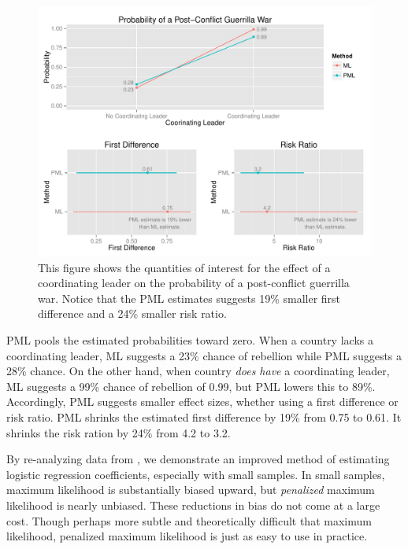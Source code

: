 \documentclass[12pt]{article}
\begin{document}
\begin{figure}[H]
\begin{center}
\includegraphics[width = \textwidth]{figs/weisiger-qis.pdf}
\caption{This figure shows the quantities of interest for the effect of a coordinating leader on the probability of a post-conflict guerrilla war. Notice that the PML estimates suggests 19\% smaller first difference and a 24\% smaller risk ratio.}\label{fig:weisiger-qis}
\end{center}
\end{figure}

PML pools the estimated probabilities toward zero. 
When a country lacks a coordinating leader, ML suggests a 23\% chance of rebellion while PML suggests a 28\% chance. 
On the other hand, when country \textit{does have} a coordinating leader, ML suggests a 99\% chance of rebellion of 0.99, but PML lowers this to 89\%. 
Accordingly, PML suggests smaller effect sizes, whether using a first difference or risk ratio. 
PML shrinks the estimated first difference by 19\% from 0.75 to 0.61. 
It shrinks the risk ration by 24\% from 4.2 to 3.2.  

By re-analyzing data from \cite{Weisiger2014}, we demonstrate an improved method of estimating logistic regression coefficients, especially with small samples. 
In small samples, maximum likelihood is substantially biased upward, but \textit{penalized} maximum likelihood is nearly unbiased. These reductions in bias do not come at a large cost. Though perhaps more subtle and theoretically difficult that maximum likelihood, penalized maximum likelihood is just as easy to use in practice.
\end{document}
